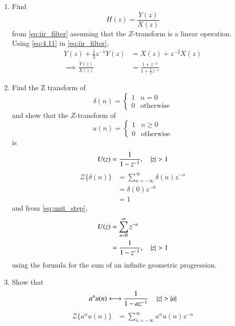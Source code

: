 \documentclass[journal,12pt,twocolumn]{IEEEtran}
\theoremstyle{remark}
\renewcommand\thesection{\arabic{section}}
\numberwithin{equation}{subsection}
\begin{document}
\begin{enumerate}[label=\thesection.\arabic*]
\item Find
%
\begin{equation}
H(z) = \frac{Y(z)}{X(z)}
\end{equation}
%
from  \eqref{eq:iir_filter} assuming that the $Z$-transform is a linear operation.
\\
\solution Using \eqref{eq:4.11} in \eqref{eq:iir_filter},
\begin{align}
Y(z) + \frac{1}{2}z^{-1}Y(z) &= X(z)+z^{-2}X(z)
\\
\implies \frac{Y(z)}{X(z)} &= \frac{1 + z^{-2}}{1 + \frac{1}{2}z^{-1}}
\label{eq:freq_resp}
\end{align}
%
\item Find the Z transform of 
\begin{equation}
\delta(n)
=
\begin{cases}
1 & n = 0
\\
0 & \text{otherwise}
\end{cases}
\end{equation}
and show that the $Z$-transform of
\begin{equation}
\label{eq:unit_step}
u(n)
=
\begin{cases}
1 & n \ge 0
\\
0 & \text{otherwise}
\end{cases}
\end{equation}
is
\begin{equation}
U(z) = \frac{1}{1-z^{-1}}, \quad \left\vert z\right\vert > 1
\end{equation}
\solution
\begin{align}
{\mathcal{Z}}\{\delta(n)\} &= \sum_{n=-\infty}^{\infty}\delta(n)z^{-n}\\
&= \delta(0)z^{-0}\\
&= 1
\end{align}
and from \eqref{eq:unit_step},
\begin{align}
U(z) &= \sum _{n= 0}^{\infty}z^{-n}
\\
&=\frac{1}{1-z^{-1}}, \quad \left\vert z\right\vert > 1
\end{align}
using the formula for the sum of an infinite geometric progression.
%
\item Show that 
\begin{equation}
\label{eq:anun}
a^nu(n) \system \frac{1}{1-az^{-1}} \quad \abs{z} > \abs{a}
\end{equation}
%
\solution
\begin{align}
    {\mathcal{Z}}\{a^nu(n)\} &= \sum_{n=-\infty}^{\infty}a^nu(n)z^{-n}\\

\end{align}
\end{enumerate}
\end{document}
